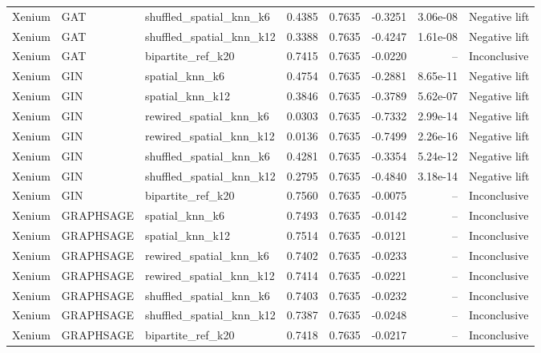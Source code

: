 \begin{longtable}{lllrrrrl}
Xenium & GAT & shuffled\_spatial\_knn\_k6 & 0.4385 & 0.7635 & -0.3251 & 3.06e-08 & Negative lift \\
Xenium & GAT & shuffled\_spatial\_knn\_k12 & 0.3388 & 0.7635 & -0.4247 & 1.61e-08 & Negative lift \\
Xenium & GAT & bipartite\_ref\_k20 & 0.7415 & 0.7635 & -0.0220 & -- & Inconclusive \\
Xenium & GIN & spatial\_knn\_k6 & 0.4754 & 0.7635 & -0.2881 & 8.65e-11 & Negative lift \\
Xenium & GIN & spatial\_knn\_k12 & 0.3846 & 0.7635 & -0.3789 & 5.62e-07 & Negative lift \\
Xenium & GIN & rewired\_spatial\_knn\_k6 & 0.0303 & 0.7635 & -0.7332 & 2.99e-14 & Negative lift \\
Xenium & GIN & rewired\_spatial\_knn\_k12 & 0.0136 & 0.7635 & -0.7499 & 2.26e-16 & Negative lift \\
Xenium & GIN & shuffled\_spatial\_knn\_k6 & 0.4281 & 0.7635 & -0.3354 & 5.24e-12 & Negative lift \\
Xenium & GIN & shuffled\_spatial\_knn\_k12 & 0.2795 & 0.7635 & -0.4840 & 3.18e-14 & Negative lift \\
Xenium & GIN & bipartite\_ref\_k20 & 0.7560 & 0.7635 & -0.0075 & -- & Inconclusive \\
Xenium & GRAPHSAGE & spatial\_knn\_k6 & 0.7493 & 0.7635 & -0.0142 & -- & Inconclusive \\
Xenium & GRAPHSAGE & spatial\_knn\_k12 & 0.7514 & 0.7635 & -0.0121 & -- & Inconclusive \\
Xenium & GRAPHSAGE & rewired\_spatial\_knn\_k6 & 0.7402 & 0.7635 & -0.0233 & -- & Inconclusive \\
Xenium & GRAPHSAGE & rewired\_spatial\_knn\_k12 & 0.7414 & 0.7635 & -0.0221 & -- & Inconclusive \\
Xenium & GRAPHSAGE & shuffled\_spatial\_knn\_k6 & 0.7403 & 0.7635 & -0.0232 & -- & Inconclusive \\
Xenium & GRAPHSAGE & shuffled\_spatial\_knn\_k12 & 0.7387 & 0.7635 & -0.0248 & -- & Inconclusive \\
Xenium & GRAPHSAGE & bipartite\_ref\_k20 & 0.7418 & 0.7635 & -0.0217 & -- & Inconclusive \\
\end{longtable}

